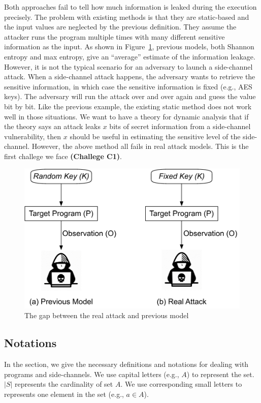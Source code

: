 Both approaches fail to tell how much information is leaked during the execution
precisely. The problem with existing methods is that they are static-based and
the input values are neglected by the previous definition. They assume the
attacker runs the program multiple times with many different sensitive
information as the input. As shown in Figure~\ref{fig:gap}, previous models,
both Shannon entropy and max entropy, give an ``average'' estimate of the
information leakage. However, it is not the typical scenario for an adversary to
launch a side-channel attack. When a side-channel attack happens, the adversary
wants to retrieve the sensitive information, in which case the sensitive
information is fixed (e.g., AES keys). The adversary will run the attack over
and over again and guess the value bit by bit. Like the previous example, the
existing static method does not work well in those situations. We want to have a
theory for dynamic analysis that if the theory says an attack leaks $x$ bits of
secret information from a side-channel vulnerability, then $x$ should be useful
in estimating the sensitive level of the side-channel. However, the above method
all fails in real attack models. This is the first challege we face
\textbf{(Challege C1)}.

\begin{figure}
    \centering
    \includegraphics[width=.8\columnwidth]{./figures/RA.pdf}
    \caption{The gap between the real attack and previous model}\label{fig:gap}
\end{figure}


\subsection{Notations}
In the section, we give the necessary definitions and notations for dealing with
programs and side-channels. We use capital letters (e.g., $A$) to represent the
set. $|S|$ represents the cardinality of set $A$. We use corresponding small
letters to represents one element in the set (e.g., $a \in A$).

